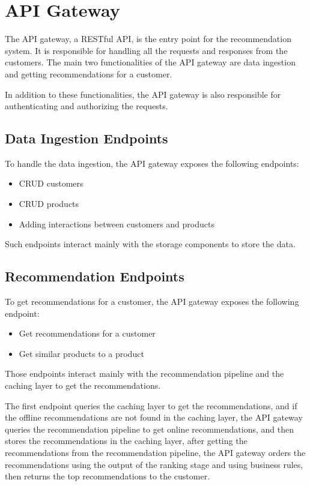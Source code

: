 \section{API Gateway}

The API gateway, a RESTful API, is the entry point for the recommendation system.
It is responsible for handling all the requests and responses from the customers.
The main two functionalities of the API gateway are data ingestion and getting recommendations for a customer.

In addition to these functionalities, the API gateway is also responsible for authenticating and authorizing the requests.

\subsection{Data Ingestion Endpoints}

To handle the data ingestion, the API gateway exposes the following endpoints:
\begin{itemize}
    \item CRUD customers
    \item CRUD products
    \item Adding interactions between customers and products
\end{itemize}

Such endpoints interact mainly with the storage components to store the data.

\subsection{Recommendation Endpoints}

To get recommendations for a customer, the API gateway exposes the following endpoint:
\begin{itemize}
    \item Get recommendations for a customer
    \item Get similar products to a product
\end{itemize}

Those endpoints interact mainly with the recommendation pipeline and the caching layer to get the recommendations.

The first endpoint queries the caching layer to get the recommendations, and if the offline recommendations are not found in the caching layer, 
the API gateway queries the recommendation pipeline to get online recommendations, and then stores the recommendations in the caching layer, 
after getting the recommendations from the recommendation pipeline, 
the API gateway orders the recommendations using the output of the ranking stage and using business rules, then returns the top recommendations to the customer.

